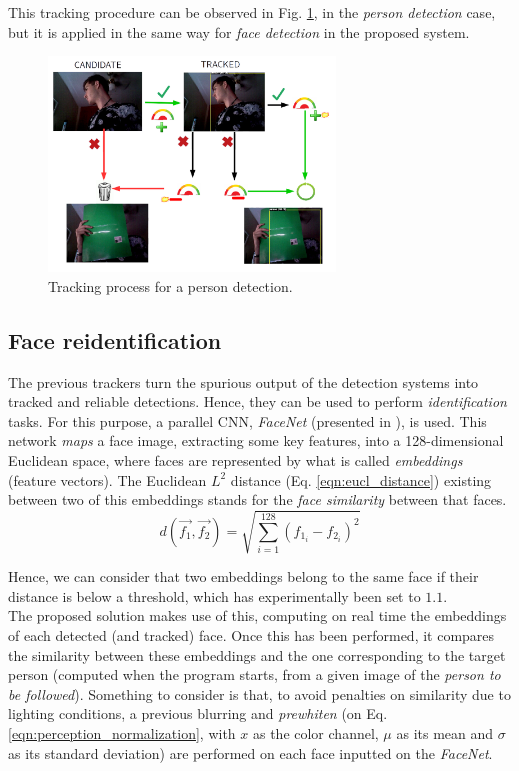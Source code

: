 This tracking procedure can be observed in Fig. \ref{fig:perception_tracker}, in the \emph{person detection} case, but it is applied in the same way for \emph{face detection} in the proposed system.\\

\begin{figure}[h]
	\centering
	\includegraphics[width=3in]{images/person_tracker}
	\caption{Tracking process for a person detection.}
	\label{fig:perception_tracker}
\end{figure}


\subsection{Face reidentification}

The previous trackers turn the spurious output of the detection systems into tracked and reliable detections. Hence, they can be used to perform \emph{identification} tasks. For this purpose, a parallel CNN, \emph{FaceNet} (presented in \cite{facenet}), is used. This network \emph{maps} a face image, extracting some key features, into a 128-dimensional Euclidean space, where faces are represented by what is called \emph{embeddings} (feature vectors). The Euclidean $L^2$ distance (Eq. \ref{eqn:eucl_distance}) existing between two of this embeddings stands for the \emph{face similarity} between that faces.\\ 

\begin{equation}
d(\vec{f_1}, \vec{f_2}) = \sqrt{\sum_{i=1}^{128}(f_{1_i} - f_{2_i})^2}
\label{eqn:eucl_distance}
\end{equation}

Hence, we can consider that two embeddings belong to the same face if their distance is below a threshold, which has experimentally been set to $1.1$.\\


The proposed solution makes use of this, computing on real time the embeddings of each detected (and tracked) face. Once this has been performed, it compares the similarity between these embeddings and the one corresponding to the target person (computed when the program starts, from a given image of the \emph{person to be followed}). Something to consider is that, to avoid penalties on similarity due to lighting conditions, a previous blurring and \emph{prewhiten} (on Eq. \ref{eqn:perception_normalization}, with $x$ as the color channel, $\mu$ as its mean and $\sigma$ as its standard deviation) are performed on each face inputted on the \emph{FaceNet}.


